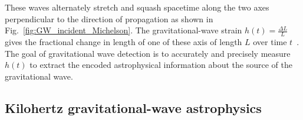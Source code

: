 These waves alternately stretch and squash spacetime along the two axes perpendicular to the direction of propagation as shown in Fig.~\ref{fig:GW_incident_Michelson}. %
The gravitational-wave strain $h(t)=\frac{\Delta L}{L}$ gives the fractional change in length of one of these axis of length $L$ over time $t$~\cite{cai_2017}. The goal of gravitational wave detection is to accurately and precisely measure $h(t)$ to extract the encoded astrophysical information about the source of the gravitational wave.


\subsection{Kilohertz gravitational-wave astrophysics} %
\label{sec:kilohertz_GW}

